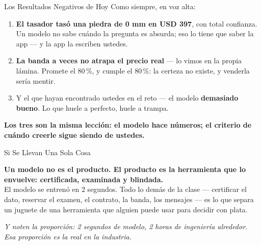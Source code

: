\documentclass[aspectratio=169, 11pt]{beamer}
\begin{document}
\begin{frame}[shrink=5]{Los Resultados Negativos de Hoy}
  \vspace{4pt}
  {\footnotesize\color{textMuted}
   Como siempre, en voz alta:}
  \vspace{6pt}
  {\footnotesize\color{textMuted}
  \begin{enumerate}\setlength{\itemsep}{6pt}
    \item[{\color{arcaRed}\scriptsize\faTimes}]
      \textbf{El tasador tasó una piedra de 0 mm en USD 397}, con total
      confianza. Un modelo no sabe cuándo la pregunta es absurda; eso lo
      tiene que saber la app --- y la app la escriben ustedes.
    \item[{\color{arcaRed}\scriptsize\faTimes}]
      \textbf{La banda a veces no atrapa el precio real} --- lo vimos en la
      propia lámina. Promete el 80\,\%, y cumple el 80\,\%: la certeza no
      existe, y venderla sería mentir.
    \item[{\color{arcaRed}\scriptsize\faTimes}]
      Y el que hayan encontrado ustedes en el reto --- el modelo
      \textbf{demasiado bueno}. Lo que huele a perfecto, huele a trampa.
  \end{enumerate}}
  \vspace{7pt}
  \begin{tcolorbox}[colback=arcaGray, colframe=arcaDark, boxrule=0pt,
    leftrule=4pt, arc=3pt, left=10pt, right=10pt, top=6pt, bottom=6pt]
    {\footnotesize\color{arcaDark}\bfseries
     Los tres son la misma lección: el modelo hace números; el criterio de
     cuándo creerle sigue siendo de ustedes.}
  \end{tcolorbox}
\end{frame}

\begin{frame}[shrink=5]{Si Se Llevan Una Sola Cosa}
  \vspace{6pt}
  \begin{tcolorbox}[colback=arcaGray, colframe=arcaRed, boxrule=0pt, leftrule=4pt,
    arc=3pt, left=10pt, right=10pt, top=9pt, bottom=9pt]
    {\large\color{arcaDark}\bfseries
     Un modelo no es el producto. El producto es la herramienta que lo
     envuelve: certificada, examinada y blindada.}\\[6pt]
    {\footnotesize\color{textMuted}
     El modelo se entrenó en 2 segundos. Todo lo demás de la clase ---
     certificar el dato, reservar el examen, el contrato, la banda, los
     mensajes --- es lo que separa un juguete de una herramienta que alguien
     puede usar para decidir con plata.}
  \end{tcolorbox}
  \vspace{8pt}
  {\footnotesize\color{arcaDark}\itshape
   Y noten la proporción: 2 segundos de modelo, 2 horas de ingeniería
   alrededor. Esa proporción es la real en la industria.}
\end{frame}
\end{document}
